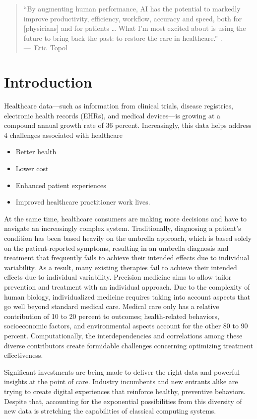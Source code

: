 \documentclass{scrartcl}
\begin{document}
\begin{quote}
``By augmenting human performance, AI has the potential to markedly improve productivity, efficiency, workflow, accuracy and speed, both for [physicians] and for patients … What I’m most excited about is using the future to bring back the past: to restore the care in healthcare.'' . \mbox{--- Eric Topol}
\end{quote}

\section{Introduction}
\label{sec:org5350abb}

Healthcare data—such as information from clinical trials, disease registries, electronic health records (EHRs), and medical devices—is growing at a compound annual growth rate of 36 percent. Increasingly, this data helps address 4 challenges associated with healthcare

\begin{itemize}
\item Better health
\item Lower cost
\item Enhanced patient experiences
\item Improved healthcare practitioner work lives.
\end{itemize}

At the same time, healthcare consumers are making more decisions and have to navigate an increasingly complex system. Traditionally, diagnosing a patient’s condition has been based heavily on the umbrella approach, which is based solely on the patient-reported symptoms, resulting in an umbrella diagnosis and treatment that frequently fails to achieve their intended effects due to individual variability. As a result, many existing therapies fail to achieve their intended effects due to individual variability. Precision medicine aims to allow tailor prevention and treatment with an individual approach. Due to the complexity of human biology, individualized medicine requires taking into account aspects that go well beyond standard medical care. Medical care only has a relative contribution of 10 to 20 percent to outcomes; health-related behaviors, socioeconomic factors, and environmental aspects account for the other 80 to 90 percent. Computationally, the interdependencies and correlations among these diverse contributors create formidable challenges concerning optimizing treatment effectiveness.

Significant investments are being made to deliver the right data and powerful insights at the point of care. Industry incumbents and new entrants alike are trying to create digital experiences that reinforce healthy, preventive behaviors. Despite that, accounting for the exponential possibilities from this diversity of new data is stretching the capabilities of classical computing systems.
\end{document}
